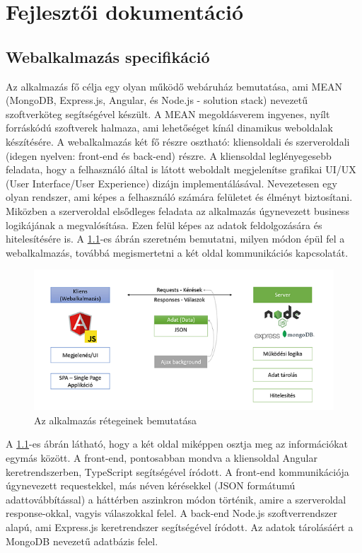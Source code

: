 \chapter{Fejlesztői dokumentáció}
\label{ch:impl}

\section{Webalkalmazás specifikáció}
\label{section:specification}
Az alkalmazás fő célja egy olyan működő webáruház bemutatása, ami MEAN (MongoDB, Express.js, Angular, és Node.js - solution stack)\cite{mean:stack} nevezetű szoftverköteg segítségével készült. A MEAN  megoldásverem ingyenes, nyílt forráskódú szoftverek halmaza, ami lehetőséget kínál dinamikus weboldalak készítésére. A webalkalmazás két fő részre osztható: kliensoldali és szerveroldali (idegen nyelven: front-end és back-end) részre. A kliensoldal leglényegesebb feladata, hogy a felhasználó által is látott weboldalt megjelenítse grafikai UI/UX (User Interface/User Experience) dizájn implementálásával. Nevezetesen egy olyan rendszer, ami képes a felhasználó számára felületet és élményt biztosítani. Miközben a szerveroldal elsődleges feladata az alkalmazás úgynevezett business logikájának a megvalósítása. Ezen felül képes az adatok feldolgozására és hitelesítésére is. A \ref{fig.picture-1}-es ábrán szeretném bemutatni, milyen módon épül fel a webalkalmazás, továbbá megismertetni a két oldal kommunikációs kapcsolatát.

\begin{figure}[H]
	\centering
	\includegraphics[width=1.0\textwidth]{images/alkalmazas_bemutatasa.png}
	\caption{Az alkalmazás rétegeinek bemutatása}
	\label{fig.picture-1}
\end{figure}

A \ref{fig.picture-1}-es ábrán látható, hogy a két oldal miképpen osztja meg az információkat egymás között. A front-end, pontosabban mondva a kliensoldal Angular\cite{angular:online} keretrendszerben, TypeScript\cite{ts} segítségével íródott. A front-end kommunikációja úgynevezett requestekkel, más néven kérésekkel (JSON formátumú adattovábbítással) a háttérben aszinkron módon történik, amire a szerveroldal response-okkal, vagyis válaszokkal felel. A back-end Node.js\cite{nodejs:online} szoftverrendszer alapú, ami Express.js\cite{express} keretrendszer segítségével íródott. Az adatok tárolásáért a MongoDB\cite{mongo} nevezetű adatbázis felel.

